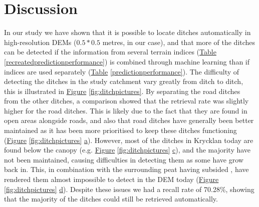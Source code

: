 \documentclass[]{interact}
\theoremstyle{plain}%
\theoremstyle{definition}
\theoremstyle{remark}
\begin{document}
\section{Discussion}

In our study we have shown that it is possible to locate ditches automatically in high-resolution DEMs ($0.5  * 0.5 $ metres, in our case), and that more of the ditches can be detected if the information from several terrain indices (\hyperref[recreatedpredictionperformance]{Table} \ref{recreatedpredictionperformance}) is combined through machine learning than if indices are used separately (\hyperref[predictionperformance]{Table} \ref{predictionperformance}).
The difficulty of detecting the ditches in the study catchment vary greatly from ditch to ditch, this is illustrated in \hyperref[fig:ditchpictures]{Figure} \ref{fig:ditchpictures}.
By separating the road ditches from the other ditches, a comparison showed that the retrieval rate was slightly higher for the road ditches. This is likely due to the fact that they are found in open areas alongside roads, and also that road ditches have generally been better maintained as it has been more prioritised to keep these ditches functioning (\hyperref[fig:ditchpictures]{Figure} \ref{fig:ditchpictures} \hyperref[fig:ditchpictures]{a}). However, most of the ditches in Krycklan today are found below the canopy (e.g. \hyperref[fig:ditchpictures]{Figure} \ref{fig:ditchpictures} \hyperref[fig:ditchpictures]{c}), and the majority have not been maintained, causing difficulties in detecting them as some have grow back in. This, in combination with the surrounding peat having subsided \citep{heikurainen}, have rendered them almost impossible to detect in the DEM today (\hyperref[fig:ditchpictures]{Figure} \ref{fig:ditchpictures} \hyperref[fig:ditchpictures]{d}). Despite these issues we had a recall rate of 70.28\%, showing that the majority of the ditches could still be retrieved automatically.
\end{document}
